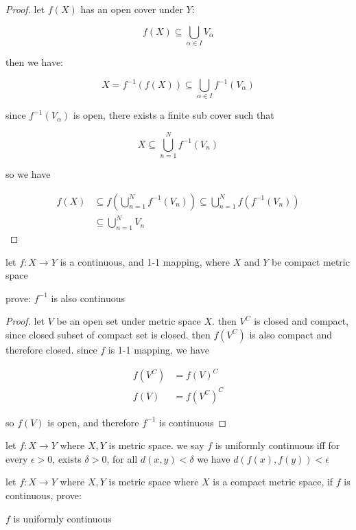 \begin{proof}
    let $f(X)$ has an open cover under $Y$:

    \[
        f(X) \subseteq \bigcup_{\alpha \in I}V_{\alpha}
    \]

    then we have:

    \[
        X = f^{-1}(f(X)) \subseteq \bigcup_{\alpha \in I}f^{-1}(V_{\alpha})
    \]

    since $f^{-1}(V_{\alpha})$ is open, there exists a finite sub cover such that

    \[
        X \subseteq \bigcup_{n=1}^{N}f^{-1}(V_n)
    \]

    so we have

    \begin{align*}
        f(X) & \subseteq f(\bigcup_{n=1}^{N}f^{-1}(V_n)) \subseteq \bigcup_{n=1}^{N}f(f^{-1}(V_n)) \\
        & \subseteq \bigcup_{n=1}^{N}V_n
    \end{align*}
\end{proof}

\begin{exercise}
    let $f: X \to Y$ is a continuous, and 1-1 mapping, where $X$ and $Y$ be compact metric space

    prove: $f^{-1}$ is also continuous
\end{exercise}

\begin{proof}
    let $V$ be an open set under metric space $X$. then $V^C$ is closed and compact, since closed subset of compact set 
    is closed. then $f(V^C)$ is also compact and therefore closed. since $f$ is 1-1 mapping, we have 

    \begin{align*}
        f(V^C) &= f(V)^C \\
        f(V) &= f(V^C)^C
    \end{align*}

    so $f(V)$ is open, and therefore $f^{-1}$  is continuous
\end{proof}

\begin{definition}
    let $f: X \to Y$ where $X, Y$ is metric space. we say $f$ is uniformly continuous iff for every $\epsilon > 0$,
    exists $\delta > 0$, for all $d(x,y) < \delta$ we have $d(f(x), f(y)) < \epsilon$
\end{definition}

\begin{exercise}
    let $f: X \to Y$ where $X, Y$ is metric space where $X$ is a compact metric space, if $f$ is continuous, prove:

    $f$ is uniformly continuous
\end{exercise}


